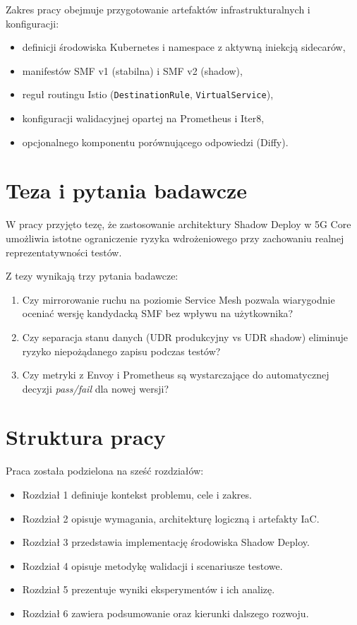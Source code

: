 Zakres pracy obejmuje przygotowanie artefaktów infrastrukturalnych i konfiguracji:
\begin{itemize}
    \item definicji środowiska Kubernetes i namespace z aktywną iniekcją sidecarów,
    \item manifestów SMF v1 (stabilna) i SMF v2 (shadow),
    \item reguł routingu Istio (\texttt{DestinationRule}, \texttt{VirtualService}),
    \item konfiguracji walidacyjnej opartej na Prometheus i Iter8,
    \item opcjonalnego komponentu porównującego odpowiedzi (Diffy).
\end{itemize}

\section{Teza i pytania badawcze}
W pracy przyjęto tezę, że zastosowanie architektury Shadow Deploy w 5G Core umożliwia istotne ograniczenie ryzyka wdrożeniowego przy zachowaniu realnej reprezentatywności testów.

Z tezy wynikają trzy pytania badawcze:
\begin{enumerate}
    \item Czy mirrorowanie ruchu na poziomie Service Mesh pozwala wiarygodnie oceniać wersję kandydacką SMF bez wpływu na użytkownika?
    \item Czy separacja stanu danych (UDR produkcyjny vs UDR shadow) eliminuje ryzyko niepożądanego zapisu podczas testów?
    \item Czy metryki z Envoy i Prometheus są wystarczające do automatycznej decyzji \emph{pass/fail} dla nowej wersji?
\end{enumerate}

\section{Struktura pracy}
Praca została podzielona na sześć rozdziałów:
\begin{itemize}
    \item Rozdział 1 definiuje kontekst problemu, cele i zakres.
    \item Rozdział 2 opisuje wymagania, architekturę logiczną i artefakty IaC.
    \item Rozdział 3 przedstawia implementację środowiska Shadow Deploy.
    \item Rozdział 4 opisuje metodykę walidacji i scenariusze testowe.
    \item Rozdział 5 prezentuje wyniki eksperymentów i ich analizę.
    \item Rozdział 6 zawiera podsumowanie oraz kierunki dalszego rozwoju.
\end{itemize}